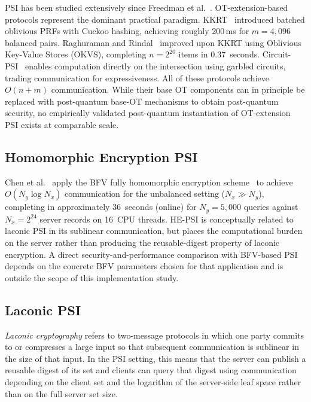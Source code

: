 \documentclass[preprint,12pt]{elsarticle}
\begin{document}
PSI has been studied extensively since Freedman et al.~\cite{freedman2004psi}.
OT-extension-based protocols represent the dominant practical paradigm.
KKRT~\cite{kolesnikov2016kkrt} introduced batched oblivious PRFs with Cuckoo
hashing, achieving roughly 200\,ms for $m = 4{,}096$ balanced pairs.
Raghuraman and Rindal~\cite{raghuraman2022blazing} improved upon KKRT using
Oblivious Key-Value Stores (OKVS), completing $n = 2^{20}$ items in
0.37~seconds. Circuit-PSI~\cite{pinkas2019efficient} enables computation
directly on the intersection using garbled circuits, trading communication
for expressiveness. All of these protocols achieve $O(n + m)$ communication.
While their base OT components can in principle be replaced with
post-quantum base-OT mechanisms to obtain post-quantum
security, no empirically validated post-quantum instantiation of
OT-extension PSI exists at comparable scale.

\subsection{Homomorphic Encryption PSI}

Chen et al.~\cite{chen2017fast} apply the BFV fully homomorphic encryption
scheme~\cite{fan2012fhe} to achieve $O(N_y \log N_x)$ communication for the
unbalanced setting ($N_x \gg N_y$), completing in approximately 36~seconds
(online) for $N_y = 5{,}000$ queries against $N_x = 2^{24}$ server records on
16~CPU threads. HE-PSI is conceptually related to laconic PSI in its sublinear
communication, but places the computational burden on the server rather than
producing the reusable-digest property of laconic encryption. A direct security-and-performance comparison with BFV-based PSI depends on
the concrete BFV parameters chosen for that application and is outside the
scope of this implementation study.


\subsection{Laconic PSI}

\emph{Laconic cryptography} refers to two-message protocols in which one
party commits to or compresses a large input so that subsequent communication
is sublinear in the size of that input. In the PSI setting, this means that
the server can publish a reusable digest of its set and clients can query that
digest using communication depending on the client set and the logarithm of
the server-side leaf space rather than on the full server set size.
\end{document}
